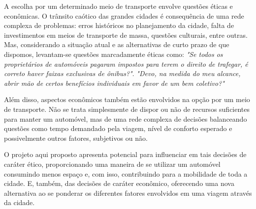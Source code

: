 \documentclass[12pt,journal,compsoc]{IEEEtran}
\begin{document}


A escolha por um determinado meio de transporte envolve questões éticas 
e econômicas. O trânsito caótico das grandes cidades é consequência de uma
rede complexa de problemas: erros históricos no planejamento da cidade, falta de investimentos em
meios de transporte de massa, questões culturais, entre outras. Mas, considerando
a situação atual e as alternativas de curto prazo de que dispomos, levantam-se 
questões marcadamente éticas como: \emph{"Se todos os proprietários de automóveis pagaram
impostos para terem o direito de trafegar, é correto haver faixas exclusivas de ônibus?"}.
\emph{"Devo, na medida do meu alcance, abrir mão de certos benefícios individuais em favor
de um bem coletivo?"}

Além disso, aspectos econômicos também estão envolvidos na opção por um meio
de transporte. Não se trata simplesmente de dispor ou não de recursos suficientes
para manter um automóvel, mas de uma rede complexa de decisões balanceando
questões como tempo demandado pela viagem, nível de conforto esperado e
possivelmente outros fatores, subjetivos ou não.

O projeto aqui proposto apresenta potencial para influenciar em tais decisões
de caráter ético, proporcionando uma maneira de se utilizar um automóvel
consumindo menos espaço e, com isso, contribuindo para a mobilidade de toda a
cidade. E, também, das decisões de caráter econômico, oferecendo uma nova alternativa 
ao se ponderar os diferentes fatores envolvidos em uma viagem
através da cidade.



\end{document}
